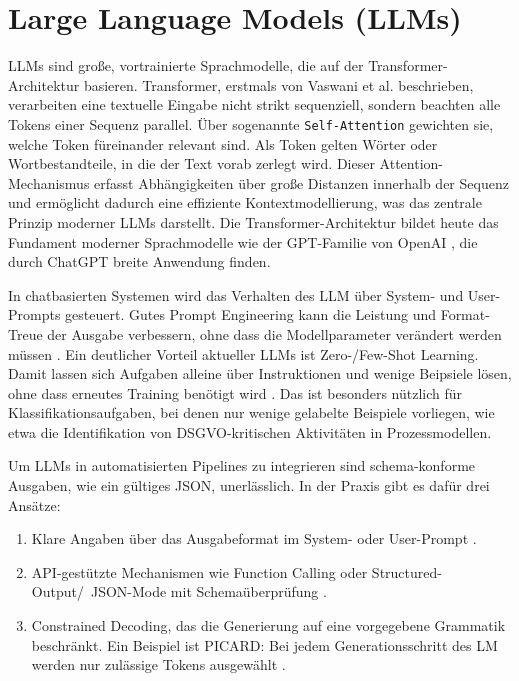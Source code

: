 \section{Large Language Models (LLMs)}\label{sec:llms}

\acp{LLM} sind große, vortrainierte Sprachmodelle, die auf der Transformer-Architektur basieren. Transformer, erstmals von Vaswani et al. \cite{vaswani2017attention} beschrieben, verarbeiten eine textuelle Eingabe nicht strikt sequenziell, sondern beachten alle Tokens einer Sequenz parallel. Über sogenannte \texttt{Self-Attention} gewichten sie, welche Token füreinander relevant sind. Als Token gelten Wörter oder Wortbestandteile, in die der Text vorab zerlegt wird. Dieser Attention-Mechanismus erfasst Abhängigkeiten über große Distanzen innerhalb der Sequenz und ermöglicht dadurch eine effiziente Kontextmodellierung, was das zentrale Prinzip moderner \acp{LLM} darstellt. Die Transformer-Architektur bildet heute das Fundament moderner Sprachmodelle wie der GPT-Familie von OpenAI \cite{ibm-gpt, minaee2025largelanguagemodelssurvey, openai-models}, die durch ChatGPT breite Anwendung finden.

In chatbasierten Systemen wird das Verhalten des \ac{LLM} über System- und User-Prompts gesteuert. Gutes Prompt Engineering kann die Leistung und Format-Treue der Ausgabe verbessern, ohne dass die Modellparameter verändert werden müssen \cite{liu2023prompting}. Ein deutlicher Vorteil aktueller \acp{LLM} ist Zero-/Few-Shot Learning. Damit lassen sich Aufgaben alleine über Instruktionen und wenige Beipsiele lösen, ohne dass erneutes Training benötigt wird \cite{brown2020fewshot, liu2023prompting}. Das ist besonders nützlich für Klassifikationsaufgaben, bei denen nur wenige gelabelte Beispiele vorliegen, wie etwa die Identifikation von \ac{DSGVO}-kritischen Aktivitäten in Prozessmodellen.

Um \acp{LLM} in automatisierten Pipelines zu integrieren sind schema-konforme Ausgaben, wie ein gültiges JSON, unerlässlich. In der Praxis gibt es dafür drei Ansätze:

\begin{enumerate}
    \item Klare Angaben über das Ausgabeformat im System- oder User-Prompt \cite{liu2023prompting}.
    \item API-gestützte Mechanismen wie Function Calling oder Structured-Output/\linebreak~JSON-Mode mit Schemaüberprüfung \cite{mistralai_structured_output, openai_function_calling_2023, openai_structured_output}.
    \item Constrained Decoding, das die Generierung auf eine vorgegebene Grammatik beschränkt. Ein Beispiel ist PICARD: Bei jedem Generationsschritt des \ac{LM} werden nur zulässige Tokens ausgewählt \cite{scholak2021picard}.
\end{enumerate}

